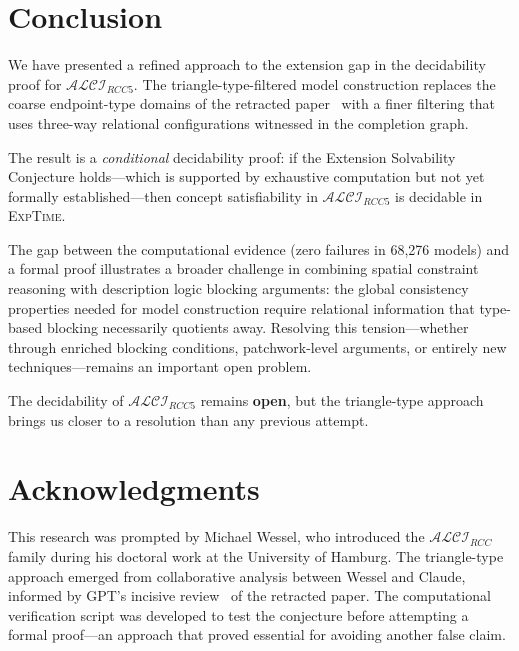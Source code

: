 \documentclass[a4paper,11pt]{article}
\theoremstyle{definition}
\newcommand{\ALCIRCC}[1]{\ensuremath{\mathcal{ALCI}_{\mathit{RCC#1}}}}
\newcommand{\EXPTIME}{\textsc{ExpTime}}
\begin{document}
\section{Conclusion}
\label{sec:conclusion}

We have presented a refined approach to the extension gap in the
decidability proof for $\ALCIRCC{5}$.  The triangle-type-filtered
model construction replaces the coarse endpoint-type domains of the
retracted paper~\cite{ExtensionGapPaper} with a finer filtering that
uses three-way relational configurations witnessed in the completion
graph.

The result is a \emph{conditional} decidability proof: if the
Extension Solvability Conjecture holds---which is supported by
exhaustive computation but not yet formally established---then concept
satisfiability in $\ALCIRCC{5}$ is decidable in \EXPTIME.

The gap between the computational evidence (zero failures in 68,276
models) and a formal proof illustrates a broader challenge in
combining spatial constraint reasoning with description logic
blocking arguments: the global consistency properties needed for model
construction require relational information that type-based blocking
necessarily quotients away.  Resolving this tension---whether through
enriched blocking conditions, patchwork-level arguments, or entirely
new techniques---remains an important open problem.

\medskip
\noindent
The decidability of $\ALCIRCC{5}$ remains \textbf{open}, but the
triangle-type approach brings us closer to a resolution than any
previous attempt.


\section*{Acknowledgments}

This research was prompted by Michael Wessel, who introduced the
$\ALCIRCC{}$ family during his doctoral work at the University of
Hamburg.  The triangle-type approach emerged from collaborative
analysis between Wessel and Claude, informed by GPT's incisive
review~\cite{GPTReview} of the retracted paper.  The computational
verification script was developed to test the conjecture before
attempting a formal proof---an approach that proved essential for
avoiding another false claim.
\end{document}
